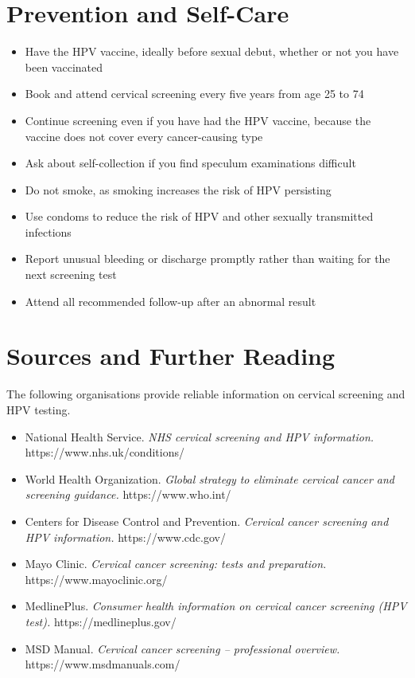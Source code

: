 \section*{Prevention and Self-Care}
\begin{itemize}
    \item Have the HPV vaccine, ideally before sexual debut, whether or not you have been vaccinated
    \item Book and attend cervical screening every five years from age 25 to 74
    \item Continue screening even if you have had the HPV vaccine, because the vaccine does not cover every cancer-causing type
    \item Ask about self-collection if you find speculum examinations difficult
    \item Do not smoke, as smoking increases the risk of HPV persisting
    \item Use condoms to reduce the risk of HPV and other sexually transmitted infections
    \item Report unusual bleeding or discharge promptly rather than waiting for the next screening test
    \item Attend all recommended follow-up after an abnormal result
\end{itemize}

\section*{Sources and Further Reading}
The following organisations provide reliable information on cervical screening and HPV testing.

\begin{itemize}
    \item National Health Service. \textit{NHS cervical screening and HPV information.} https://www.nhs.uk/conditions/
    \item World Health Organization. \textit{Global strategy to eliminate cervical cancer and screening guidance.} https://www.who.int/
    \item Centers for Disease Control and Prevention. \textit{Cervical cancer screening and HPV information.} https://www.cdc.gov/
    \item Mayo Clinic. \textit{Cervical cancer screening: tests and preparation.} https://www.mayoclinic.org/
    \item MedlinePlus. \textit{Consumer health information on cervical cancer screening (HPV test).} https://medlineplus.gov/
    \item MSD Manual. \textit{Cervical cancer screening -- professional overview.} https://www.msdmanuals.com/
\end{itemize}
